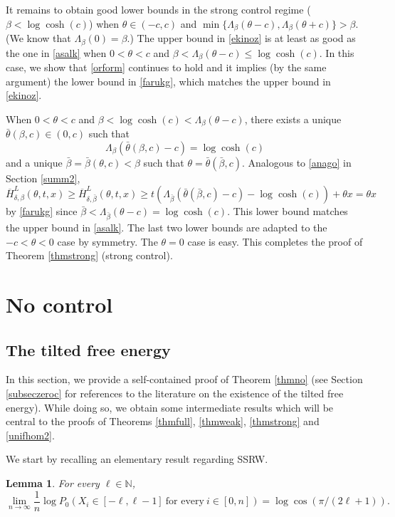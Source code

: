 \documentclass[a4paper]{amsart}
\numberwithin{equation}{section}
\theoremstyle{plain}
\newtheorem{lemma}[theorem]{\sc Lemma}
\theoremstyle{remark}
\begin{document}
It remains to obtain good lower bounds in the strong control regime ($\beta<\log\cosh(c)$) when $\theta\in(-c,c)$ and $\min\{\Lambda_\beta(\theta - c), \Lambda_\beta(\theta + c)\} > \beta$. (We know that $\Lambda_\beta(0)=\beta$.) The upper bound in \eqref{ekinoz} is at least as good as the one in \eqref{asalk} when $0<\theta<c$ and $\beta<\Lambda_\beta(\theta-c)\le\log\cosh(c)$. In this case, we show that \eqref{orform} continues to hold and it implies (by the same argument) the lower bound in \eqref{farukg}, which matches the upper bound in \eqref{ekinoz}.

When $0<\theta<c$ and $\beta<\log\cosh(c)<\Lambda_\beta(\theta-c)$, there exists a unique $\bar\theta(\beta,c)\in(0,c)$ such that
$$\Lambda_\beta(\bar\theta(\beta,c)-c) = \log\cosh(c)$$
and a unique $\bar\beta = \bar\beta(\theta,c)<\beta$ such that $\theta = \bar\theta(\bar\beta,c)$.
Analogous to \eqref{anago} in Section \ref{summ2},
$$\overline H_{\delta,\beta}^L(\theta,t,x) \ge \overline H_{\delta,\bar\beta}^L(\theta,t,x)\ge t(\Lambda_{\bar\beta}(\bar\theta(\bar\beta,c) - c) - \log\cosh(c)) + \theta x = \theta x$$
by \eqref{farukg} since $\bar\beta < \Lambda_{\bar\beta}(\theta - c) = \log\cosh(c)$. This lower bound matches the upper bound in \eqref{asalk}. The last two lower bounds are adapted to the $-c<\theta<0$ case by symmetry. The $\theta=0$ case is easy. This completes the proof of Theorem \ref{thmstrong} (strong control).

\section{No control}\label{zerocontrol}

\subsection{The tilted free energy}\label{existtilt}

In this section, we provide a self-contained proof of Theorem \ref{thmno} (see Section \ref{subseczeroc} for references to the literature on the existence of the tilted free energy). While doing so, we obtain some intermediate results which will be central to the proofs of Theorems \ref{thmfull}, \ref{thmweak}, \ref{thmstrong} and \ref{unifhom2}.

We start by recalling an elementary result regarding SSRW.

\begin{lemma}\label{appasakla}
For every $\ell\in\mathbb{N}$,
$$\lim_{n\to\infty}\frac1{n}\log P_0(X_i\in[-\ell,\ell-1]\ \text{for every}\ i\in[0,n]) = \log\cos(\pi/(2\ell + 1)).$$
\end{lemma}
\end{document}
